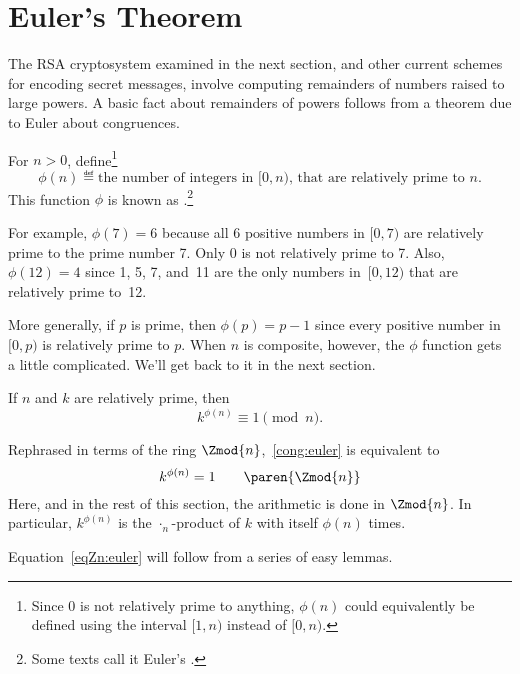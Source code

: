 \section{Euler's Theorem}\label{Euler_sec}

The RSA cryptosystem examined in the next section, and other current
schemes for encoding secret messages, involve computing remainders of
numbers raised to large powers.  A basic fact about remainders of
powers follows from a theorem due to Euler about congruences.

\begin{definition}
For $n>0$, define\footnote{Since 0 is not relatively prime to
  anything, $\phi(n)$ could equivalently be defined using the
  interval $[1,n)$ instead of $[0,n)$.}
\[
\phi(n) \eqdef \text{the number of integers in $[0, n)$, that are relatively prime
  to~$n$.}
\]
This function $\phi$ is known as .\footnote{Some texts call it Euler's .}
\end{definition}

For example, $\phi(7) = 6$ because all 6 positive numbers in $[0,7)$
  are relatively prime to the prime number 7.  Only 0 is not
  relatively prime to 7.   Also, $\phi(12) = 4$ since 1, 5, 7,
  and~11 are the only numbers in~$[0, 12)$ that are relatively prime
    to~12.

More generally, if $p$ is prime, then $\phi(p) = p - 1$ since every
positive number in $[0,p)$ is relatively prime to $p$.  When $n$ is
  composite, however, the $\phi$ function gets a little complicated.
  We'll get back to it in the next section.

\begin{theorem}
If $n$ and $k$ are relatively prime, then
\begin{equation}\label{cong:euler}
k^{\phi(n)} \equiv 1 \pmod{n}.
\end{equation}
\end{theorem}

Rephrased in terms of the ring $\Zmod{n}$,~\eqref{cong:euler} is
equivalent to
\begin{equation}\label{eqZn:euler}
    k^{\phi(n)} = 1 \qquad \paren{\Zmod{n}}
\end{equation}
Here, and in the rest of this section, the arithmetic is done in
$\Zmod{n}$.  In particular, $k^{\phi(n)}$ is the $\cdot_n$-product of
$k$ with itself $\phi(n)$ times.

Equation~\eqref{eqZn:euler} will follow from a series of easy lemmas.

